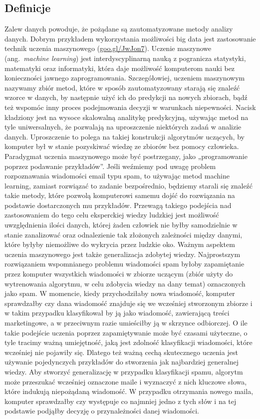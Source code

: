 \documentclass[12pt,a4paper,twoside,openany]{book}
\begin{document}
\subsection{Definicje}
Zalew danych powoduje, że pożądane są zautomatyzowane metody analizy danych. Dobrym przykładem wykorzystania możliwości big data jest zastosowanie technik uczenia maszynowego (\url{goo.gl/JwJon7}). Uczenie maszynowe (ang.~\textit{machine learning}) jest interdyscyplinarną nauką z pogranicza statystyki, matematyki oraz informatyki, która daje możliwość komputerom nauki bez konieczności jawnego zaprogramowania. Szczegółowiej, uczeniem maszynowym nazywamy zbiór metod, które w sposób zautomatyzowany starają się znaleźć wzorce w danych, by następnie użyć ich do predykcji na nowych zbiorach, bądź też wspomóc inny proces podejmowania decyzji w warunkach niepewności. Nacisk kładziony jest na wysoce skalowalną analitykę predykcyjną, używając metod na tyle uniwersalnych, że pozwalają na uproszczenie niektórych zadań w analizie danych. Uproszczenie to polega na takiej konstrukcji algorytmów uczących, by komputer był w stanie pozyskiwać wiedzę ze zbiorów bez pomocy człowieka. Paradygmat uczenia maszynowego może być postrzegany, jako „programowanie poprzez podawanie przykładów”. Jeśli weźmiemy pod uwagę problem rozpoznawania wiadomości email typu spam, to używając metod machine learning, zamiast rozwiązać to zadanie bezpośrednio, będziemy starali się znaleźć takie metody, które pozwolą komputerowi samemu dojść do rozwiązania na podstawie dostarczonych mu przykładów. Przewagą takiego podejścia nad zastosowaniem do tego celu eksperckiej wiedzy ludzkiej jest możliwość uwzględnienia ilości danych, której żaden człowiek nie byłby samodzielnie w stanie zanalizować oraz odnalezienie tak złożonych zależności między danymi, które byłyby niemożliwe do wykrycia przez ludzkie oko. Ważnym aspektem uczenia maszynowego jest także generalizacja zdobytej wiedzy. Najprostszym rozwiązaniem wspomnianego problemu wiadomości spam byłoby zapamiętanie przez komputer wszystkich wiadomości w zbiorze uczącym (zbiór użyty do wytrenowania algorytmu, w celu zdobycia wiedzy na dany temat) oznaczonych jako spam. W momencie, kiedy przychodziłaby nowa wiadomość, komputer sprawdzałby czy dana wiadomość znajduje się we wcześniej stworzonym zbiorze i w takim przypadku klasyfikował by ją jako wiadomość, zawierającą treści marketingowe, a w przeciwnym razie umieściłby ją w skrzynce odbiorczej. O ile takie podejście uczenia poprzez zapamiętywanie może być czasami użyteczne, o tyle tracimy ważną umiejętność, jaką jest zdolność klasyfikacji wiadomości, które wcześniej nie pojawiły się. Dlatego też ważną cechą skutecznego uczenia jest używanie pojedynczych przykładów do stworzenia jak najbardziej generalnej wiedzy. Aby stworzyć generalizację w przypadku klasyfikacji spamu, algorytm może przeszukać wcześniej oznaczone maile i wyznaczyć z nich kluczowe słowa, które indukują niepożądaną wiadomość. W przypadku otrzymania nowego maila, komputer sprawdzałby czy występuje co najmniej jedno z tych słów i na tej podstawie podjąłby decyzję o przynależności danej wiadomości.
\end{document}
